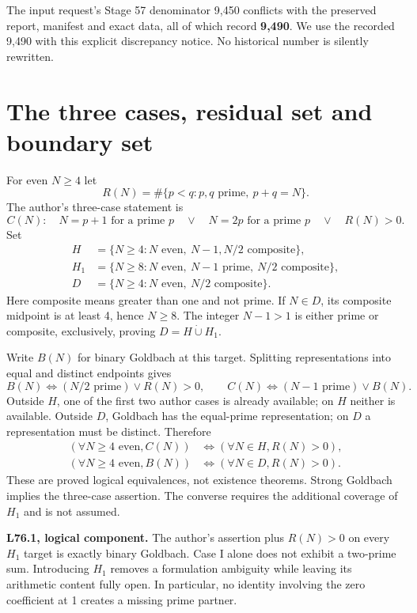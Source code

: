 \documentclass[11pt,a4paper]{article}
\begin{document}
The input request's Stage 57 denominator 9,450 conflicts with the preserved report, manifest and exact data, all of which record \textbf{9,490}. We use the recorded 9,490 with this explicit discrepancy notice. No historical number is silently rewritten.
\newpage
\section{The three cases, residual set and boundary set}
For even $N\ge4$ let
\[
 R(N)=\#\{p<q:p,q\text{ prime},\ p+q=N\}.
\]
The author's three-case statement is
\[
 C(N):\quad N=p+1\text{ for a prime }p\quad\lor\quad
 N=2p\text{ for a prime }p\quad\lor\quad R(N)>0.
\]
Set
\begin{align*}
H&=\{N\ge4:N\text{ even},\ N-1,N/2\text{ composite}\},\\
H_1&=\{N\ge8:N\text{ even},\ N-1\text{ prime},\ N/2\text{ composite}\},\\
D&=\{N\ge4:N\text{ even},\ N/2\text{ composite}\}.
\end{align*}
Here composite means greater than one and not prime. If $N\in D$, its composite midpoint is at least 4, hence $N\ge8$. The integer $N-1>1$ is either prime or composite, exclusively, proving $D=H\mathbin{\dot\cup}H_1$.

Write $B(N)$ for binary Goldbach at this target. Splitting representations into equal and distinct endpoints gives
\[
 B(N)\iff (N/2\text{ prime})\lor R(N)>0,
 \qquad C(N)\iff(N-1\text{ prime})\lor B(N).
\]
Outside $H$, one of the first two author cases is already available; on $H$ neither is available. Outside $D$, Goldbach has the equal-prime representation; on $D$ a representation must be distinct. Therefore
\begin{align*}
(\forall N\ge4\text{ even},C(N))&\iff(\forall N\in H,R(N)>0),\\
(\forall N\ge4\text{ even},B(N))&\iff(\forall N\in D,R(N)>0).
\end{align*}
These are proved logical equivalences, not existence theorems. Strong Goldbach implies the three-case assertion. The converse requires the additional coverage of $H_1$ and is not assumed.

\textbf{L76.1, logical component.} The author's assertion plus $R(N)>0$ on every $H_1$ target is exactly binary Goldbach. Case I alone does not exhibit a two-prime sum. Introducing $H_1$ removes a formulation ambiguity while leaving its arithmetic content fully open. In particular, no identity involving the zero coefficient at 1 creates a missing prime partner.
\newpage
\end{document}
